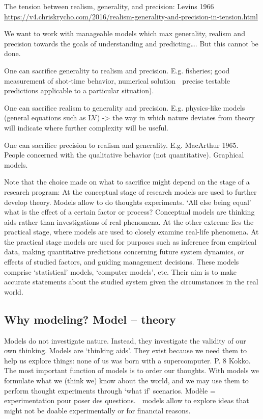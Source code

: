 \documentclass[
]{book}
\theoremstyle{definition}
\theoremstyle{definition}
\theoremstyle{definition}
\theoremstyle{definition}
\theoremstyle{remark}
\begin{document}
The tension between realism, generality, and precision:
Levins 1966
\url{https://v4.chriskrycho.com/2016/realism-generality-and-precision-in-tension.html}

We want to work with manageable models which max generality, realism and precision towards the goals of understanding and predicting\ldots. But this cannot be done.

One can sacrifice generality to realism and precision. E.g. fisheries; good measurement of shot-time behavior, numerical solution  precise testable predictions applicable to a particular situation).

One can sacrifice realism to generality and precision. E.g. physics-like models (general equations such as LV) -\textgreater{} the way in which nature deviates from theory will indicate where further complexity will be useful.

One can sacrifice precision to realism and generality. E.g. MacArthur 1965. People concerned with the qualitative behavior (not quantitative). Graphical models.

Note that the choice made on what to sacrifice might depend on the stage of a research program:
At the conceptual stage of research models are used to further develop
theory. Models allow to do thoughts experiments. `All else being equal' what
is the effect of a certain factor or process? Conceptual models are thinking aids rather than investigations of real phenomena.
At the other extreme lies the practical stage, where models are used to closely
examine real-life phenomena. At the practical stage models are used for purposes such as inference from empirical data, making quantitative predictions concerning future system dynamics, or effects of studied factors, and guiding management decisions. These models comprise `statistical' models, `computer models', etc. Their aim is to make accurate statements about the studied system given the circumstances in the real world.

\subsection{Why modeling? Model -- theory}\label{why-modeling-model-theory}

Models do not investigate nature. Instead, they investigate the validity of our own thinking. Models are `thinking aids'. They exist because we need them to help us explore things: none of us was born with a supercomputer. P. 8 Kokko. The most important function of models is to order our thoughts. With models we formulate what we (think we) know about the world, and we may use them to perform thought experiments through `what if' scenarios. Modèle = experimentation pour poser des questions.
 models allow to explore ideas that might not be doable experimentally or for financial reasons.
\end{document}
